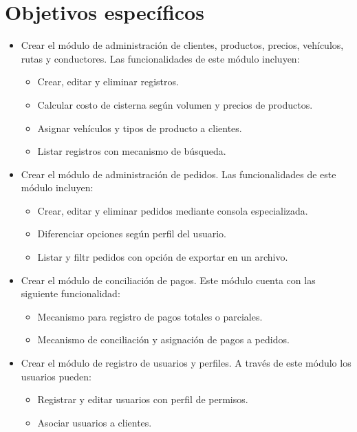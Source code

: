 \section*{Objetivos específicos}
\begin{itemize}
    \item Crear el módulo de administración de clientes, productos, precios, vehículos, rutas y conductores. Las funcionalidades de este módulo incluyen:
    \begin{itemize}
        \item Crear, editar y eliminar registros.
        \item Calcular costo de cisterna según volumen y precios de productos.
        \item Asignar vehículos y tipos de producto a clientes.
        \item Listar registros con mecanismo de búsqueda.
    \end{itemize}

    \item Crear el módulo de administración de pedidos. Las funcionalidades de este módulo incluyen:
    \begin{itemize}
        \item Crear, editar y eliminar pedidos mediante consola especializada.
        \item Diferenciar opciones según perfil del usuario.
        \item Listar y filtr pedidos con opción de exportar en un archivo.
    \end{itemize}

    \item Crear el módulo de conciliación de pagos. Este módulo cuenta con las siguiente funcionalidad:
    \begin{itemize}
        \item Mecanismo para registro de pagos totales o parciales.
        \item Mecanismo de conciliación y asignación de pagos a pedidos.
    \end{itemize}

    \item Crear el módulo de registro de usuarios y perfiles. A través de este módulo los usuarios pueden:
    \begin{itemize}
        \item Registrar y editar usuarios con perfil de permisos.
        \item Asociar usuarios a clientes.
    \end{itemize}
\end{itemize}